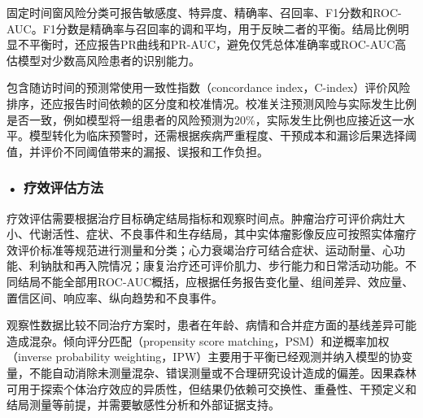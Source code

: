 固定时间窗风险分类可报告敏感度、特异度、精确率、召回率、F1分数和ROC-AUC。F1分数是精确率与召回率的调和平均，用于反映二者的平衡。结局比例明显不平衡时，还应报告PR曲线和PR-AUC，避免仅凭总体准确率或ROC-AUC高估模型对少数高风险患者的识别能力。

包含随访时间的预测常使用一致性指数（concordance index，C-index）评价风险排序，还应报告时间依赖的区分度和校准情况。校准关注预测风险与实际发生比例是否一致，例如模型将一组患者的风险预测为20\%，实际发生比例也应接近这一水平。模型转化为临床预警时，还需根据疾病严重程度、干预成本和漏诊后果选择阈值，并评价不同阈值带来的漏报、误报和工作负担。

\subsubsection*{\textbf{• 疗效评估方法}}

疗效评估需要根据治疗目标确定结局指标和观察时间点。肿瘤治疗可评价病灶大小、代谢活性、症状、不良事件和生存结局，其中实体瘤影像反应可按照实体瘤疗效评价标准等规范进行测量和分类；心力衰竭治疗可结合症状、运动耐量、心功能、利钠肽和再入院情况；康复治疗还可评价肌力、步行能力和日常活动功能。不同结局不能全部用ROC-AUC概括，应根据任务报告变化量、组间差异、效应量、置信区间、响应率、纵向趋势和不良事件。

观察性数据比较不同治疗方案时，患者在年龄、病情和合并症方面的基线差异可能造成混杂。倾向评分匹配（propensity score matching，PSM）和逆概率加权（inverse probability weighting，IPW）主要用于平衡已经观测并纳入模型的协变量，不能自动消除未测量混杂、错误测量或不合理研究设计造成的偏差。因果森林可用于探索个体治疗效应的异质性，但结果仍依赖可交换性、重叠性、干预定义和结局测量等前提，并需要敏感性分析和外部证据支持。

